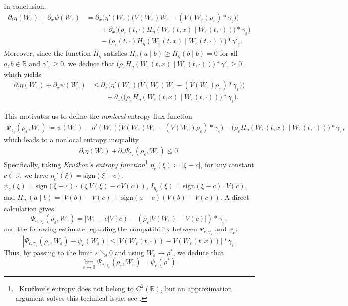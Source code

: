\documentclass[10pt]{amsart}
\theoremstyle{plain}
\theoremstyle{definition}
\numberwithin{equation}{section}
\newcommand{\R}{\mathbb{R}}
\newcommand{\eps}{{\varepsilon}}
\newcommand{\sgn}[1]{\mathrm{sign}\left(#1\right)}
\newcommand{\pt}{\partial_t}
\newcommand{\px}{\partial_x }
\begin{document}
In conclusion, 
\begin{align*}
 \pt \eta(W_\eps) + \partial_x \psi(W_\eps) &= \px \big(\eta'(W_\eps)   \big(V(W_\eps)W_\eps - (V(W_\eps) \rho_\eps) \ast \gamma_\eps\big)\big) \\ & \qquad +
     \partial_x \big( \big( \rho_\eps(t,\cdot) H_\eta(W_\eps(t,x)\mid W_\eps(t,\cdot)) \big) \ast\gamma_\eps \big) \\ & \qquad  - \big( \rho_\eps(t,\cdot) H_\eta(W_\eps(t,x)\mid W_\eps(t,\cdot)) \big) \ast\gamma'_\eps.
\end{align*}
Moreover, since the function $H_\eta$ satisfies $H_\eta(a\mid b)\geq H_\eta(b\mid b)=0$ for all $a,b\in\mathbb{R}$ and $\gamma'_\eps\geq0$, we deduce that $\big( \rho_\eps H_\eta(W_\eps(t,x)\mid W_\eps(t,\cdot)) \big) \ast\gamma'_\eps\geq0$, which yields 
\begin{align*}
 \pt \eta(W_\eps) + \partial_x \psi(W_\eps) &\le \px \big(\eta'(W_\eps)   \big(V(W_\eps)W_\eps - (V(W_\eps) \rho_\eps) \ast \gamma_\eps\big)\big) \\ & \qquad +
     \partial_x \big( \big( \rho_\eps H_\eta(W_\eps(t,x)\mid W_\eps(t,\cdot)) \big) \ast\gamma_\eps \big). 
\end{align*}

This motivates us to define the \emph{nonlocal} entropy flux function
\begin{align*}
    \Psi_{\gamma_\eps}(\rho_\eps,W_\eps) \coloneqq  \psi(W_\eps) - \eta'(W_\eps) \big(V(W_\eps)W_\eps - (V(W_\eps) \rho_\eps) \ast \gamma_\eps\big) - \big( \rho_\eps  H_\eta(W_\eps(t,x)\mid W_\eps(t,\cdot))  \big) \ast \gamma_\eps,
\end{align*}
which leads to a nonlocal entropy inequality
\begin{align*}
     \pt \eta(W_\eps) + \partial_x \Psi_{\gamma_\eps}(\rho_\eps,W_\eps) \le 0.
\end{align*}
Specifically, taking \textit{Kru\v{z}kov's entropy function}\footnote{~Kru\v{z}kov's entropy does not belong to $\mathrm{C}^2(\R)$, but an approximation argument solves this technical issue; see \cite[Chapter 2, pp.~56--58]{MR3443431}.} $\eta_c(\xi)\coloneqq |\xi-c|$, for any constant $c\in\R$, we have $\eta_c'(\xi)=\sgn{\xi-c}$, $\psi_c(\xi)=\sgn{\xi-c}\cdot(\xi\, V(\xi)-c\,V(c))$, $I_{\eta_c}(\xi)=\sgn{\xi-c}\cdot V(c)$, and $H_{\eta_c}(a\mid b) = |V(b)-V(c)| + \sgn{a-c}(V(b)-V(c))$. 
A direct calculation gives
\[ \Psi_{c,\gamma_\eps}(\rho_\varepsilon,W_\varepsilon) = |W_\varepsilon-c|V(c) - \left( \rho_\varepsilon|V(W_\varepsilon)-V(c)| \right) \ast \gamma_\eps, \]
and the following estimate regarding the compatibility between $\Psi_{c,\gamma_\eps}$ and $\psi_c$:
\[ \left|\Psi_{c,\gamma_\eps}(\rho_\varepsilon,W_\varepsilon) - \psi_c(W_\eps) \right| \leq \left| V(W_\eps(t,\cdot)) - V(W_\eps(t,x))\right| \ast \gamma_\eps. \]
Thus, by passing to the limit $\eps\searrow 0$ and using $W_\eps\to\rho^\ast$, we deduce that
\[ \lim_{\eps\to0} \Psi_{c,\gamma_\eps}(\rho_\eps,W_\eps) = \psi_c(\rho^\ast). \]
\end{document}
